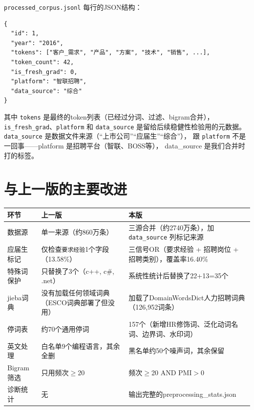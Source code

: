 \documentclass[12pt,a4paper]{ctexart}
\begin{document}
\texttt{processed\_corpus.jsonl} 每行的JSON结构：
\begin{verbatim}
{
  "id": 1,
  "year": "2016",
  "tokens": ["客户_需求", "产品", "方案", "技术", "销售", ...],
  "token_count": 42,
  "is_fresh_grad": 0,
  "platform": "智联招聘",
  "data_source": "综合"
}
\end{verbatim}

其中 \texttt{tokens} 是最终的token列表（已经过分词、过滤、bigram合并），
\texttt{is\_fresh\_grad}、\texttt{platform} 和 \texttt{data\_source}
是留给后续稳健性检验用的元数据。
\texttt{data\_source} 是数据文件来源（``上市公司''``应届生''``综合''），
跟 \texttt{platform} 不是一回事——platform 是招聘平台（智联、BOSS等），
data\_source 是我们合并时打的标签。


\section{与上一版的主要改进}
\label{sec:improvements}

\begin{longtable}{p{3cm}p{5.5cm}p{5.5cm}}
\toprule
\textbf{环节} & \textbf{上一版} & \textbf{本版} \\
\midrule
\endhead

数据源 &
单一来源（约860万条） &
三源合并（约2740万条），加 \texttt{data\_source} 列标记来源 \\
\midrule

应届生标记 &
仅检查\texttt{要求经验}1个字段（13.58\%） &
三信号OR（要求经验 + 招聘岗位 + 招聘类别），覆盖率16.40\% \\
\midrule

特殊词保护 &
只替换了3个（c++, c\#, .net） &
系统性统计后替换了22+13=35个 \\
\midrule

jieba词典 &
没有加载任何领域词典（ESCO词典部署了但没用） &
加载了DomainWordsDict人力招聘词典（126,952词条） \\
\midrule

停词表 &
约70个通用停词 &
157个（新增HR修饰词、泛化动词名词、边界词、水印词） \\
\midrule

英文处理 &
白名单9个编程语言，其余全删 &
黑名单约50个噪声词，其余保留 \\
\midrule

Bigram筛选 &
只用频次$\geq$20 &
频次$\geq$20 AND PMI$>$0 \\
\midrule

诊断统计 &
无 &
输出完整的preprocessing\_stats.json \\
\bottomrule
\end{longtable}
\end{document}
